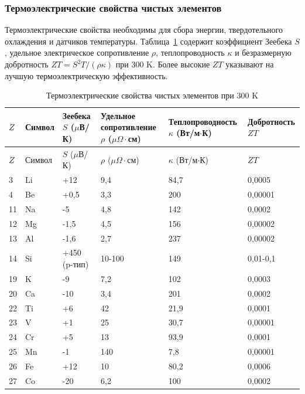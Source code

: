 \documentclass[12pt,a4paper]{article}
\begin{document}
	\subsubsection{Термоэлектрические свойства чистых элементов}
	\label{subsec:thermoelectric-properties-func}
	
	Термоэлектрические свойства необходимы для сбора энергии, твердотельного охлаждения и датчиков температуры. Таблица~\ref{tab:thermoelectric-properties-func} содержит коэффициент Зеебека \(S\), удельное электрическое сопротивление \(\rho\), теплопроводность \(\kappa\) и безразмерную добротность \(ZT = S^2 T / (\rho \kappa)\) при 300 K. Более высокие \(ZT\) указывают на лучшую термоэлектрическую эффективность.
	
	\begin{longtable}{p{0.8cm}p{1.2cm}p{2.2cm}p{2.2cm}p{2.2cm}p{2.2cm}}
		\caption{Термоэлектрические свойства чистых элементов при 300 K} \label{tab:thermoelectric-properties-func} \\
		\toprule
		\(Z\) & Символ & Зеебека \(S\) (\(\mu\)В/К) & Удельное сопротивление \(\rho\) (\(\mu\Omega\cdot\)см) & Теплопроводность \(\kappa\) (Вт/м\(\cdot\)К) & Добротность \(ZT\) \\
		\midrule
		\endfirsthead
		\toprule
		\(Z\) & Символ & \(S\) (\(\mu\)В/К) & \(\rho\) (\(\mu\Omega\cdot\)см) & \(\kappa\) (Вт/м\(\cdot\)К) & \(ZT\) \\
		\midrule
		\endhead
		3  & Li & +12 & 9,4 & 84,7 & 0,0005 \\
		4  & Be & +0,5 & 3,3 & 200 & 0,00001 \\
		11 & Na & -5 & 4,8 & 142 & 0,0002 \\
		12 & Mg & -1,5 & 4,5 & 156 & 0,00002 \\
		13 & Al & -1,6 & 2,7 & 237 & 0,00002 \\
		14 & Si & +450 (p-тип) & 10-100 & 149 & 0,01-0,1 \\
		19 & K  & -9 & 7,2 & 102 & 0,0003 \\
		20 & Ca & -10 & 3,4 & 201 & 0,0002 \\
		22 & Ti & +6 & 42 & 21,9 & 0,0001 \\
		23 & V  & +1 & 25 & 30,7 & 0,00001 \\
		24 & Cr & +5 & 13 & 93,9 & 0,0001 \\
		25 & Mn & -1 & 140 & 7,8 & 0,00001 \\
		26 & Fe & +12 & 10 & 80,2 & 0,0006 \\
		27 & Co & -20 & 6,2 & 100 & 0,0002 \\

\end{longtable}
\end{document}
